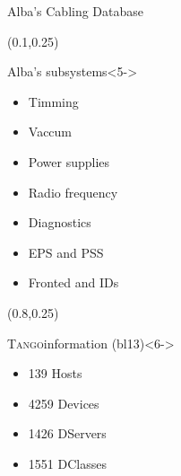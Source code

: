 \documentclass{beamer}
\newcommand{\tango}{\textsc{Tango}}
\begin{document}
\begin{frame}
\begin{textblock*}{100mm}
\begin{block}{Alba's Cabling Database}
        \end{block}
    \end{textblock*}
    \begin{textblock*}{35mm}(0.1\textwidth,0.25\textheight)
        \begin{block}{Alba's subsystems}<5->
            \begin{itemize}
                \item Timming %
                \item Vaccum %
                \item Power supplies %
                \item Radio frequency %
                \item Diagnostics %
                \item EPS and PSS
                \item Fronted and IDs
            \end{itemize}
        \end{block}
    \end{textblock*}
    \begin{textblock*}{35mm}(0.8\textwidth,0.25\textheight)
        \begin{exampleblock}{\tango information (bl13)}<6->
            \begin{itemize}
                \item 139 Hosts
                \item 4259 Devices
                \item 1426 DServers
                \item 1551 DClasses
            \end{itemize}
        \end{exampleblock}
    \end{textblock*}
\end{frame}
\end{document}
